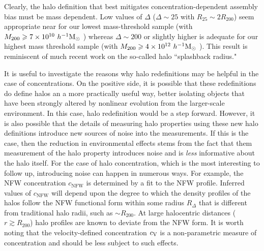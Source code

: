 \documentclass[usenatbib,usegraphicx,letterpaper]{mn2e}
\begin{document}
Clearly, the halo definition that best mitigates 
concentration-dependent assembly bias must be mass dependent. Low 
values of $\Delta$ ($\Delta \sim 25$ with $R_{25} \sim 2R_{200}$) seem appropriate near for our lowest 
mass-threshold sample (with $M_{200} \geqslant 7 \times 10^{10} \ h^{-1}\mathrm{M}_{\odot}~$) whereas $\Delta \sim 200$ or slightly higher
is adequate for our highest mass threshold sample (with $M_{200} \geqslant 4 \times 10^{12} \ h^{-1}\mathrm{M}_{\odot}~$). This result is
reminiscent of much recent work on the so-called halo ``splashback radius."\citep{more15} 




It is useful to investigate the reasons why halo redefinitions may be helpful in the case 
of concentrations. On the positive side, it is possible that these redefinitions do define 
halos an a more practically useful way, better isolating objects that have been strongly 
altered by nonlinear evolution from the larger-scale environment. In this case, halo redefinition 
would be a step forward. However, it is also possible that the details of measuring halo 
properties using these new halo definitions introduce new sources of noise into the 
measurements. If this is the case, then the reduction in environmental effects stems 
from the fact that them measurement of the halo property 
introduces noise and is {\em less} informative about the halo itself. 
For the case of halo concentration, which is the most interesting to 
follow up, introducing noise can happen in numerous ways. For example, 
the NFW concentration $c_{\mathrm{NFW}}$ is determined by a fit to the 
NFW profile. Inferred values of $c_{\mathrm{NFW}}$ will depend upon 
the degree to which the density profiles of the halos follow the NFW 
functional form within some radius $R_{\Delta}$ that is different from 
traditional halo radii, such as $\sim R_{200}$. At large halocentric 
distances ($r \gtrsim R_{200}$) halo profiles are known to deviate 
from the NFW form. It is worth noting that the velocity-defined concentration 
$c_{\rm V}$ is a non-parametric measure of concentration and should be 
less subject to such effects. 
\end{document}
